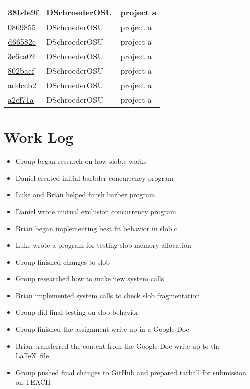 \documentclass[10pt,letterpaper,draftclsnofoot,onecolumn]{IEEEtran}
\begin{document}
\begin{tabular}{l l l}
\href{https://github.com/DSchroederOSU/CS444-Group\_11\_05/commit/38b4e9fc809248abfbe6171bbe5acd7ec8ae9b97}{38b4e9f} & DSchroederOSU & project a\\\hline
\href{https://github.com/DSchroederOSU/CS444-Group\_11\_05/commit/08698550c82847a01c3541f067be95e87277e65a}{0869855} & DSchroederOSU & project a\\\hline
\href{https://github.com/DSchroederOSU/CS444-Group\_11\_05/commit/d66582cbd505b285e6a9bf385cb3e661c0dac2ee}{d66582c} & DSchroederOSU & project a\\\hline
\href{https://github.com/DSchroederOSU/CS444-Group\_11\_05/commit/3e6ca02daac4d25b57286f456ed20a0198cd5d41}{3e6ca02} & DSchroederOSU & project a\\\hline
\href{https://github.com/DSchroederOSU/CS444-Group\_11\_05/commit/802bacfe4421a997f13ec296d43903c8e05f8aed}{802bacf} & DSchroederOSU & project a\\\hline
\href{https://github.com/DSchroederOSU/CS444-Group\_11\_05/commit/addccb2e0e7fea06f6c9de824f6b2aefc5abe16f}{addccb2} & DSchroederOSU & project a\\\hline
\href{https://github.com/DSchroederOSU/CS444-Group\_11\_05/commit/a2ef71a6c16720d27666486aab80c0423d43e61a}{a2ef71a} & DSchroederOSU & project a\\\hline\end{tabular}
\pagebreak

\section{Work Log}
\bigskip

\begin{itemize}
\item Group began research on how slob.c works
\item Daniel created initial barbder concurrency program
\item Luke and Brian helped finish barber program
\item Daniel wrote mutual exclusion concurrency program
\item Brian began implementing best fit behavior in slob.c
\item Luke wrote a program for testing slob memory allocation
\item Group finished changes to slob
\item Group researched how to make new system calls
\item Brian implemented system calls to check slob fragmentation
\item Group did final testing on slob behavior
\item Group finished the assignment write-up in a Google Doc
\item Brian transferred the content from the Google Doc write-up to the \LaTeX\ file
\item Group pushed final changes to GitHub and prepared tarball for submission on TEACH
\end{itemize}
\end{document}
